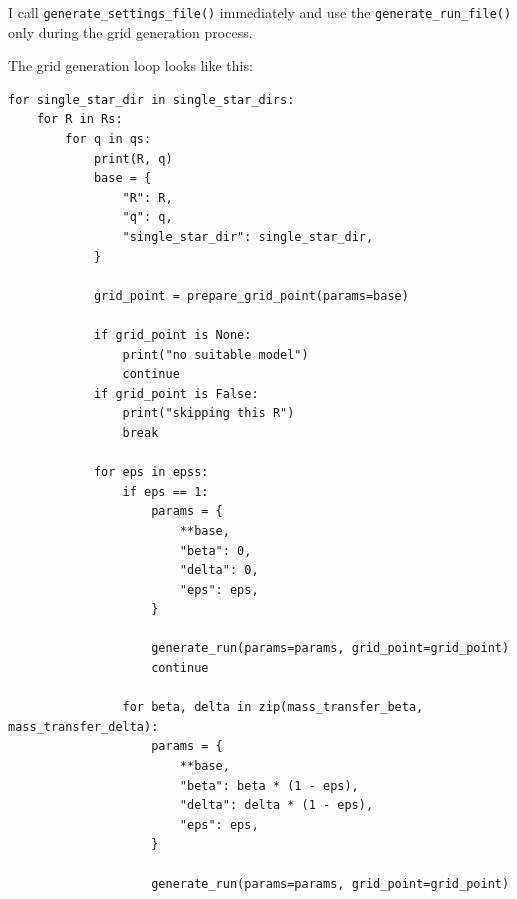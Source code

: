 \documentclass[a4paper,10pt]{article}
\begin{document}
I call \lstinline[style=output, breaklines=true]|generate_settings_file()| immediately and use the \lstinline[style=output, breaklines=true]|generate_run_file()| only during the grid generation process.


The grid generation loop looks like this:
\begin{verbatim}
for single_star_dir in single_star_dirs:
    for R in Rs:
        for q in qs:
            print(R, q)
            base = {
                "R": R,
                "q": q,
                "single_star_dir": single_star_dir,
            }

            grid_point = prepare_grid_point(params=base)

            if grid_point is None:
                print("no suitable model")
                continue
            if grid_point is False:
                print("skipping this R")
                break

            for eps in epss:
                if eps == 1:
                    params = {
                        **base,
                        "beta": 0,
                        "delta": 0,
                        "eps": eps,
                    }

                    generate_run(params=params, grid_point=grid_point)
                    continue

                for beta, delta in zip(mass_transfer_beta, mass_transfer_delta):
                    params = {
                        **base,
                        "beta": beta * (1 - eps),
                        "delta": delta * (1 - eps),
                        "eps": eps,
                    }

                    generate_run(params=params, grid_point=grid_point)
\end{verbatim}
\end{document}

